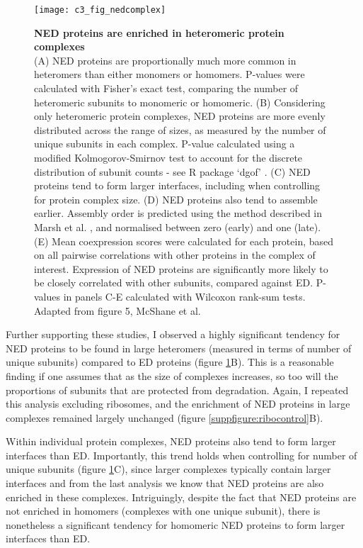 \documentclass[a4paper,11pt,twoside,openright]{scrbook}
\begin{document}
\begin{figure}
    \texttt{[image: c3\_fig\_nedcomplex]}
    \caption[NED proteins are enriched in heteromeric protein complexes]{\sffamily \textbf{NED proteins are enriched in heteromeric protein complexes} \\ \small (A) NED proteins are proportionally much more common in heteromers than either monomers or homomers. P-values were calculated with Fisher's exact test, comparing the number of heteromeric subunits to monomeric or homomeric. (B) Considering only heteromeric protein complexes, NED proteins are more evenly distributed across the range of sizes, as measured by the number of unique subunits in each complex. P-value calculated using a modified Kolmogorov-Smirnov test to account for the discrete distribution of subunit counts - see R package `dgof' \cite{Arnold2011}. (C) NED proteins tend to form larger interfaces, including when controlling for protein complex size. (D) NED proteins also tend to assemble earlier. Assembly order is predicted using the method described in Marsh et al. \cite{Marsh2013}, and normalised between zero (early) and one (late). (E) Mean coexpression scores were calculated for each protein, based on all pairwise correlations with other proteins in the complex of interest. Expression of NED proteins are significantly more likely to be closely correlated with other subunits, compared against ED. P-values in panels C-E calculated with Wilcoxon rank-sum tests. Adapted from figure 5, McShane et al.\cite{McShane2016}}
    \label{figure:nedcomplex}
\end{figure}

Further supporting these studies, I observed a highly significant tendency for NED proteins to be found in large heteromers (measured in terms of number of unique subunits) compared to ED proteins (figure \ref{figure:nedcomplex}B). This is a reasonable finding if one assumes that as the size of complexes increases, so too will the proportions of subunits that are protected from degradation. Again, I repeated this analysis excluding ribosomes, and the enrichment of NED proteins in large complexes remained largely unchanged (figure \ref{suppfigure:ribocontrol}B).

Within individual protein complexes, NED proteins also tend to form larger interfaces than ED. Importantly, this trend holds when controlling for number of unique subunits (figure \ref{figure:nedcomplex}C), since larger complexes typically contain larger interfaces and from the last analysis we know that NED proteins are also enriched in these complexes. Intriguingly, despite the fact that NED proteins are not enriched in homomers (complexes with one unique subunit), there is nonetheless a significant tendency for homomeric NED proteins to form larger interfaces than ED.
\end{document}
